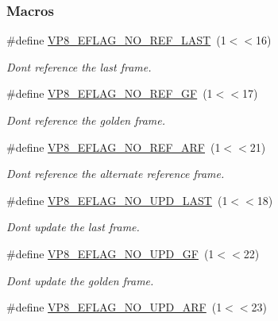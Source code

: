 \subsubsection*{Macros}
\begin{DoxyCompactItemize}
\item 
\#define \hyperlink{group__vp8__encoder_gafb51c67e5743275146bc1fc425727da3}{V\+P8\+\_\+\+E\+F\+L\+A\+G\+\_\+\+N\+O\+\_\+\+R\+E\+F\+\_\+\+L\+A\+ST}~(1$<$$<$16)
\begin{DoxyCompactList}\small\item\em Don\textquotesingle{}t reference the last frame. \end{DoxyCompactList}\item 
\#define \hyperlink{group__vp8__encoder_gabb5e95343a2738abef44eca13059da33}{V\+P8\+\_\+\+E\+F\+L\+A\+G\+\_\+\+N\+O\+\_\+\+R\+E\+F\+\_\+\+GF}~(1$<$$<$17)
\begin{DoxyCompactList}\small\item\em Don\textquotesingle{}t reference the golden frame. \end{DoxyCompactList}\item 
\#define \hyperlink{group__vp8__encoder_ga650ab0baea12be91082226a5cc18776a}{V\+P8\+\_\+\+E\+F\+L\+A\+G\+\_\+\+N\+O\+\_\+\+R\+E\+F\+\_\+\+A\+RF}~(1$<$$<$21)
\begin{DoxyCompactList}\small\item\em Don\textquotesingle{}t reference the alternate reference frame. \end{DoxyCompactList}\item 
\#define \hyperlink{group__vp8__encoder_ga602edb6b02a89cb2db7a16d6dffba583}{V\+P8\+\_\+\+E\+F\+L\+A\+G\+\_\+\+N\+O\+\_\+\+U\+P\+D\+\_\+\+L\+A\+ST}~(1$<$$<$18)
\begin{DoxyCompactList}\small\item\em Don\textquotesingle{}t update the last frame. \end{DoxyCompactList}\item 
\#define \hyperlink{group__vp8__encoder_gab01d066c5236457d345ce1cab4c41d6b}{V\+P8\+\_\+\+E\+F\+L\+A\+G\+\_\+\+N\+O\+\_\+\+U\+P\+D\+\_\+\+GF}~(1$<$$<$22)
\begin{DoxyCompactList}\small\item\em Don\textquotesingle{}t update the golden frame. \end{DoxyCompactList}\item 
\#define \hyperlink{group__vp8__encoder_ga1cff46a5287e73a620660030d40b9e6c}{V\+P8\+\_\+\+E\+F\+L\+A\+G\+\_\+\+N\+O\+\_\+\+U\+P\+D\+\_\+\+A\+RF}~(1$<$$<$23)

\end{DoxyCompactItemize}
